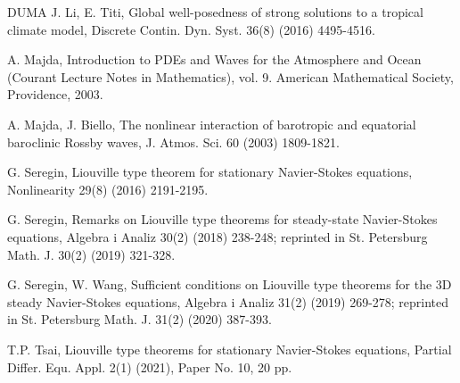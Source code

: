 \documentclass[11pt,reqno]{amsart}
\numberwithin{Thm}{section}
\begin{document}
\begin {thebibliography}{DUMA}
 J. Li, E. Titi, Global well-posedness of strong solutions to a tropical climate model, Discrete Contin. Dyn. Syst. 36(8) (2016) 4495-4516.

 A. Majda, Introduction to PDEs and Waves for the Atmosphere and Ocean (Courant Lecture Notes in Mathematics), vol. 9. American Mathematical Society, Providence, 2003.

 A. Majda, J. Biello, The nonlinear interaction of barotropic and equatorial baroclinic Rossby waves, J. Atmos. Sci. 60 (2003) 1809-1821.

 G. Seregin, Liouville type theorem for stationary Navier-Stokes equations, Nonlinearity 29(8) (2016) 2191-2195.

 G. Seregin, Remarks on Liouville type theorems for steady-state Navier-Stokes equations, Algebra i Analiz   30(2) (2018) 238-248;  reprinted in  St. Petersburg Math. J.  30(2)  (2019) 321-328.

 G. Seregin, W. Wang, Sufficient conditions on Liouville type theorems for the 3D steady Navier-Stokes equations, Algebra i Analiz 31(2) (2019) 269-278; reprinted in St. Petersburg Math. J. 31(2) (2020) 387-393.

 T.P. Tsai, Liouville type theorems for stationary Navier-Stokes equations, Partial Differ. Equ. Appl. 2(1) (2021), Paper No. 10, 20 pp.


\end{thebibliography}
\end{document}
